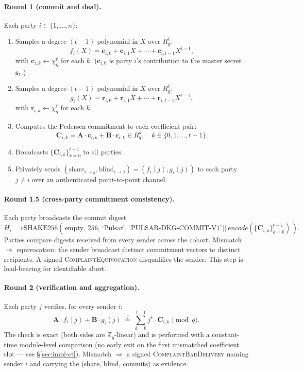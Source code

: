\documentclass[11pt,a4paper]{article}
\theoremstyle{definition}
\theoremstyle{remark}
\newcommand{\Rq}{R_q}
\newcommand{\Zq}{\mathbb{Z}_q}
\newcommand{\cSHAKE}{\mathrm{cSHAKE256}}
\begin{document}
\paragraph{Round 1 (commit and deal).}
Each party $i \in \{1, \dots, n\}$:
\begin{enumerate}[leftmargin=*, itemsep=0pt]
\item Samples a degree-$(t-1)$ polynomial in $X$ over $\Rq^\ell$:
\[
f_i(X) = \mathbf{c}_{i,0} + \mathbf{c}_{i,1} X + \cdots + \mathbf{c}_{i,t-1} X^{t-1},
\]
with $\mathbf{c}_{i,k} \gets \chi_\eta^\ell$ for each $k$. ($\mathbf{c}_{i,0}$ is party $i$'s contribution to the master secret $\mathbf{s}_1$.)
\item Samples a degree-$(t-1)$ polynomial in $X$ over $\Rq^\ell$:
\[
g_i(X) = \mathbf{r}_{i,0} + \mathbf{r}_{i,1} X + \cdots + \mathbf{r}_{i,t-1} X^{t-1},
\]
with $\mathbf{r}_{i,k} \gets \chi_\eta^\ell$ for each $k$.
\item Computes the Pedersen commitment to each coefficient pair:
\[
\mathbf{C}_{i,k} = \mathbf{A} \cdot \mathbf{c}_{i,k} + \mathbf{B} \cdot \mathbf{r}_{i,k}
\in \Rq^k, \quad k \in \{0, 1, \dots, t-1\}.
\]
\item Broadcasts $\{\mathbf{C}_{i,k}\}_{k=0}^{t-1}$ to all parties.
\item Privately sends $(\text{share}_{i \to j}, \text{blind}_{i \to j}) = (f_i(j), g_i(j))$ to each party $j \ne i$ over an authenticated point-to-point channel.
\end{enumerate}

\paragraph{Round 1.5 (cross-party commitment consistency).}
Each party broadcasts the commit digest
\[
H_i = \cSHAKE(\,\text{empty},\,256,\,\text{`Pulsar'},\,
\text{`PULSAR-DKG-COMMIT-V1'}\,||\,\mathit{encode}(\{\mathbf{C}_{i,k}\}_{k=0}^{t-1})\,).
\]
Parties compare digests received from every sender across the cohort.
Mismatch $\Rightarrow$ equivocation: the sender broadcast distinct
commitment vectors to distinct recipients. A signed
\textsc{ComplaintEquivocation} disqualifies the sender. This step is
load-bearing for identifiable abort.

\paragraph{Round 2 (verification and aggregation).}
Each party $j$ verifies, for every sender $i$:
\[
\mathbf{A} \cdot f_i(j) + \mathbf{B} \cdot g_i(j) \;\stackrel{?}{=}\;
\sum_{k=0}^{t-1} j^k \cdot \mathbf{C}_{i,k} \pmod q.
\]
The check is exact (both sides are $\Zq$-linear) and is performed
with a constant-time module-level comparison (no early exit on the
first mismatched coefficient slot --- see
\S\ref{sec:impl-ct}). Mismatch $\Rightarrow$ a signed
\textsc{ComplaintBadDelivery} naming sender $i$ and carrying the
(share, blind, commits) as evidence.
\end{document}
